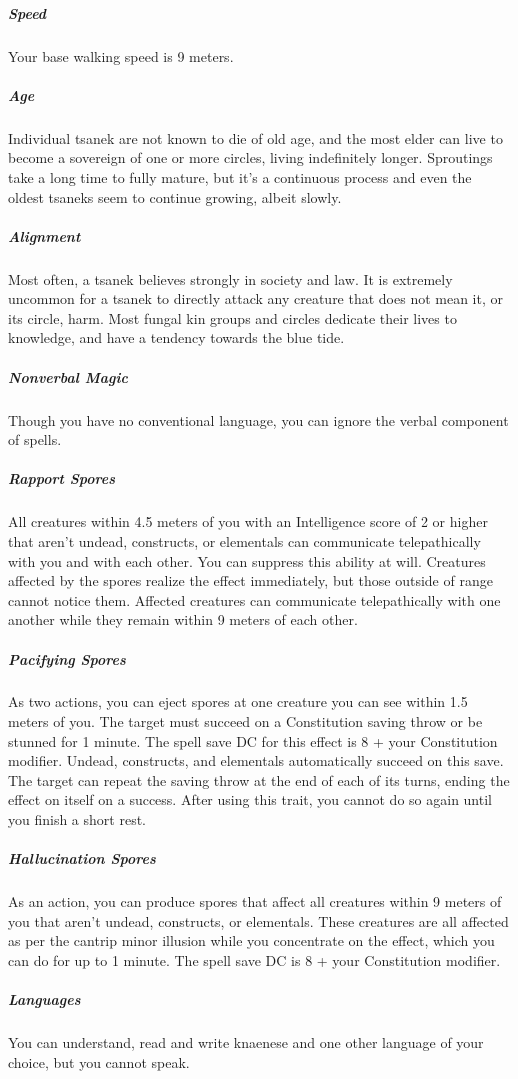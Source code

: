 \begin{linenumbers}
\subparagraph{Speed} Your base walking speed is 9 meters.

\subparagraph{Age} Individual tsanek are not known to die of old age, and the most elder can live to become a sovereign of one or more circles, living indefinitely longer.
Sproutings take a long time to fully mature, but it's a continuous process and even the oldest tsaneks seem to continue growing, albeit slowly.

\subparagraph{Alignment} Most often, a tsanek believes strongly in society and law.
It is extremely uncommon for a tsanek to directly attack any creature that does not mean it, or its circle, harm.
Most fungal kin groups and circles dedicate their lives to knowledge, and have a tendency towards the blue tide.

\subparagraph{Nonverbal Magic} Though you have no conventional language, you can ignore the verbal component of spells.

\subparagraph{Rapport Spores} All creatures within 4.5 meters of you with an Intelligence score of 2 or higher that aren't undead, constructs, or elementals can communicate telepathically with you and with each other.
You can suppress this ability at will.
Creatures affected by the spores realize the effect immediately, but those outside of range cannot notice them.
Affected creatures can communicate telepathically with one another while they remain within 9 meters of each other.

\subparagraph{Pacifying Spores} As two actions, you can eject spores at one creature you can see within 1.5 meters of you.
The target must succeed on a Constitution saving throw or be stunned for 1 minute.
The spell save DC for this effect is 8 + your Constitution modifier.
Undead, constructs, and elementals automatically succeed on this save.
The target can repeat the saving throw at the end of each of its turns, ending the effect on itself on a success.
After using this trait, you cannot do so again until you finish a short rest.

\subparagraph{Hallucination Spores} As an action, you can produce spores that affect all creatures within 9 meters of you that aren't undead, constructs, or elementals.
These creatures are all affected as per the cantrip minor illusion while you concentrate on the effect, which you can do for up to 1 minute.
The spell save DC is 8 + your Constitution modifier.

\subparagraph{Languages} You can understand, read and write knaenese and one other language of your choice, but you cannot speak.


\end{linenumbers}
